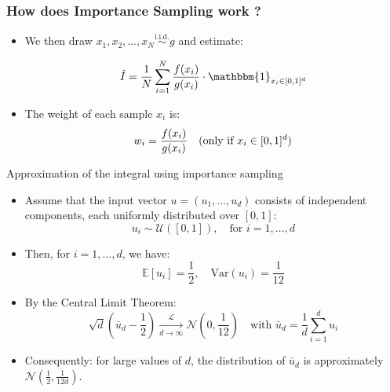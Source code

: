 \documentclass[aspectratio=169,xcolor=dvipsnames]{beamer}
\newcommand{\bdOne}{\mathbbm{1}}
\begin{document}
    \begin{frame}
        \frametitle{How does Importance Sampling work ?}
        \begin{itemize}
            \item<1->We then draw \( x_1, x_2, \dots, x_N \overset{\text{i.i.d.}}{\sim} g \) and estimate:
        
            \[
            \hat{I} = \frac{1}{N} \sum_{i=1}^N \frac{f(x_i)}{g(x_i)} \cdot \bdOne_{x_i \in [0,1]^d}
            \]
    
            \vspace{1em}
             \item<2->The weight of each sample \( x_i \) is:
            \[
            w_i = \frac{f(x_i)}{g(x_i)} \quad \text{(only if \( x_i \in [0,1]^d \))}
            \]
        \end{itemize}
    \end{frame}




    

    \begin{frame}{Approximation of the integral using importance sampling}
    \begin{itemize}
            \item<1-> Assume that the input vector \( u = (u_1, \dots, u_d) \) consists of independent components, each uniformly distributed over \([0,1]\):
        \[
        u_i \sim \mathcal{U}([0, 1]), \quad \text{for } i = 1, \dots, d
        \]
        
        \bigskip
        \item<2->Then, for \( i = 1, \dots, d \), we have:
        \[
        \mathbb{E}[u_i] = \frac{1}{2}, \quad \mathrm{Var}(u_i) = \frac{1}{12}
        \]
        
        \item<3->By the Central Limit Theorem:
        \[
        \sqrt{d} \left( \bar{u}_d - \frac{1}{2} \right) \xrightarrow[d \to \infty]{\mathcal{L}} \mathcal{N}\left(0, \frac{1}{12}\right)
        \quad \text{with } \bar{u}_d = \frac{1}{d} \sum_{i=1}^d u_i
        \]

        \item<4->Consequently: for large values of $d$, the distribution of $\bar{u}_d$ is approximately $\mathcal{N}\left( \frac{1}{2}, \frac{1}{12d} \right)$.
        \end{itemize}
    \end{frame}
    
\end{document}
